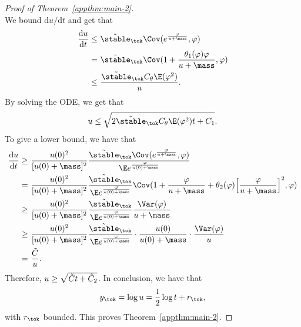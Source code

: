 \begin{proof}[Proof of Theorem~\ref{appthm:main-2}]
\[\]
We bound $\mathrm{d}u/\mathrm{d}t$ and get that
\begin{align*}
\frac{\mathrm{d}u}{\mathrm{d}t} \leq &~ \Tilde{\stable}_\tok \Cov(e^{\frac{\varphi}{u+\mass}}, \varphi)\\
= &~ \Tilde{\stable}_\tok\Cov(1 + \frac{\theta_1(\varphi)\varphi}{u+\mass}, \varphi)\\
\leq &~ \frac{\Tilde{\stable}_\tok C_\theta \E(\varphi^2)}{u}.
\end{align*}
By solving the ODE, we get that
\begin{align*}
u \leq \sqrt{2 \Tilde{\stable}_\tok C_\theta \E(\varphi^2) t + C_1}.
\end{align*}
To give a lower bound, we have that
\begin{align*}
\frac{\mathrm{d}u}{\mathrm{d}t} \geq &~ \frac{u(0)^2}{[u(0)+\mass]^2}\frac{\Tilde{\stable}_\tok \Cov(e^{\frac{\varphi}{u+\mass}},\varphi)}{\E e^{\frac{\varphi}{u(0)+\mass}}} \\
= &~ \frac{u(0)^2}{[u(0)+\mass]^2}\frac{\Tilde{\stable}_\tok}{\E e^{\frac{\varphi}{u(0)+\mass}}} \Cov(1+\frac{\varphi}{u+\mass}+\theta_2(\varphi) \Big[\frac{\varphi}{u+\mass}\Big]^2,\varphi)\\
\geq &~ \frac{u(0)^2}{[u(0)+\mass]^2}\frac{\Tilde{\stable}_\tok}{\E e^{\frac{\varphi}{u(0)+\mass}}} \frac{\Var(\varphi)}{u+\mass}\\
\geq &~ \frac{u(0)^2}{[u(0)+\mass]^2}\frac{\Tilde{\stable}_\tok}{\E e^{\frac{\varphi}{u(0)+\mass}}} \cdot \frac{u(0)}{u(0)+\mass} \cdot \frac{\Var(\varphi)}{u}\\
= &~  \frac{\Tilde{C}}{u}.
\end{align*}
Therefore, $u \geq \sqrt{\Tilde{C} t + \Tilde{C}_2}$. In conclusion, we have that
\[
y_{\tok} = \log u = \frac{1}{2}\log t + r_{\tok},
\]
with $r_{\tok}$ bounded. This proves Theorem~\ref{appthm:main-2}.
\end{proof}

